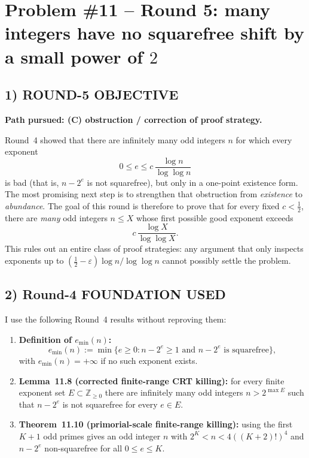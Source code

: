 \section{Problem \#11 -- Round 5: many integers have no squarefree shift by a small power of $2$}

\subsection{1) ROUND-5 OBJECTIVE}
\textbf{Path pursued: (C) obstruction / correction of proof strategy.}

Round~4 showed that there are infinitely many odd integers $n$ for which every exponent
\[
0\le e\le c\,\frac{\log n}{\log\log n}
\]
is bad (that is, $n-2^e$ is not squarefree), but only in a one-point existence form. The most promising next step is to strengthen that obstruction from \emph{existence} to \emph{abundance}. The goal of this round is therefore to prove that for every fixed $c<\tfrac12$, there are \emph{many} odd integers $n\le X$ whose first possible good exponent exceeds
\[
 c\,\frac{\log X}{\log\log X}.
\]
This rules out an entire class of proof strategies: any argument that only inspects exponents up to $(\tfrac12-\varepsilon)\log n/\log\log n$ cannot possibly settle the problem.

\subsection{2) Round-4 FOUNDATION USED}
I use the following Round~4 results without reproving them:
\begin{enumerate}
\item \textbf{Definition of $e_{\min}(n)$:}
\[
 e_{\min}(n):=\min\{e\ge 0: n-2^e\ge 1\text{ and }n-2^e\text{ is squarefree}\},
\]
with $e_{\min}(n)=+\infty$ if no such exponent exists.
\item \textbf{Lemma~11.8 (corrected finite-range CRT killing):} for every finite exponent set $E\subset\mathbb Z_{\ge 0}$ there are infinitely many odd integers $n>2^{\max E}$ such that $n-2^e$ is not squarefree for every $e\in E$.
\item \textbf{Theorem~11.10 (primorial-scale finite-range killing):} using the first $K+1$ odd primes gives an odd integer $n$ with $2^K<n<4((K+2)!)^4$ and $n-2^e$ non-squarefree for all $0\le e\le K$.
\end{enumerate}

